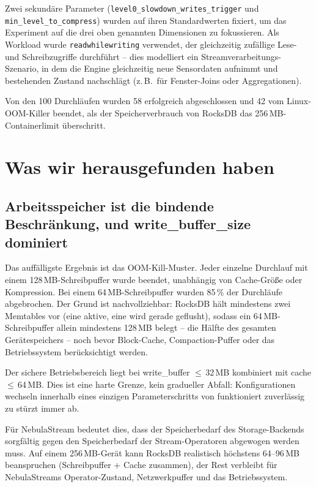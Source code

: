 \documentclass[11pt,a4paper]{scrartcl}
\begin{document}
Zwei sekundäre Parameter (\texttt{level0\_slowdown\_writes\_trigger} und
\texttt{min\_level\_to\_compress}) wurden auf ihren Standardwerten fixiert, um
das Experiment auf die drei oben genannten Dimensionen zu fokussieren. Als
Workload wurde \texttt{readwhilewriting} verwendet, der gleichzeitig zufällige
Lese- und Schreibzugriffe durchführt -- dies modelliert ein
Streamverarbeitungs-Szenario, in dem die Engine gleichzeitig neue Sensordaten
aufnimmt und bestehenden Zustand nachschlägt (z.\,B.\ für Fenster-Joins oder
Aggregationen).

Von den 100 Durchläufen wurden 58 erfolgreich abgeschlossen und 42 vom
Linux-OOM-Killer beendet, als der Speicherverbrauch von RocksDB das
256\,MB-Containerlimit überschritt.


\section{Was wir herausgefunden haben}

\subsection{Arbeitsspeicher ist die bindende Beschränkung, und write\_buffer\_size dominiert}

Das auffälligste Ergebnis ist das OOM-Kill-Muster. Jeder einzelne Durchlauf
mit einem 128\,MB-Schreibpuffer wurde beendet, unabhängig von Cache-Größe oder
Kompression. Bei einem 64\,MB-Schreibpuffer wurden 85\,\% der Durchläufe
abgebrochen. Der Grund ist nachvollziehbar: RocksDB hält mindestens zwei
Memtables vor (eine aktive, eine wird gerade geflusht), sodass ein
64\,MB-Schreibpuffer allein mindestens 128\,MB belegt -- die Hälfte des
gesamten Gerätespeichers -- noch bevor Block-Cache, Compaction-Puffer oder das
Betriebssystem berücksichtigt werden.

Der sichere Betriebsbereich liegt bei write\_buffer $\leq$\,32\,MB kombiniert
mit cache $\leq$\,64\,MB. Dies ist eine harte Grenze, kein gradueller Abfall:
Konfigurationen wechseln innerhalb eines einzigen Parameterschritts von
\glqq funktioniert zuverlässig\grqq{} zu \glqq stürzt immer ab\grqq.

Für NebulaStream bedeutet dies, dass der Speicherbedarf des Storage-Backends
sorgfältig gegen den Speicherbedarf der Stream-Operatoren abgewogen werden
muss. Auf einem 256\,MB-Gerät kann RocksDB realistisch höchstens 64--96\,MB
beanspruchen (Schreibpuffer + Cache zusammen), der Rest verbleibt für
NebulaStreams Operator-Zustand, Netzwerkpuffer und das Betriebssystem.
\end{document}
